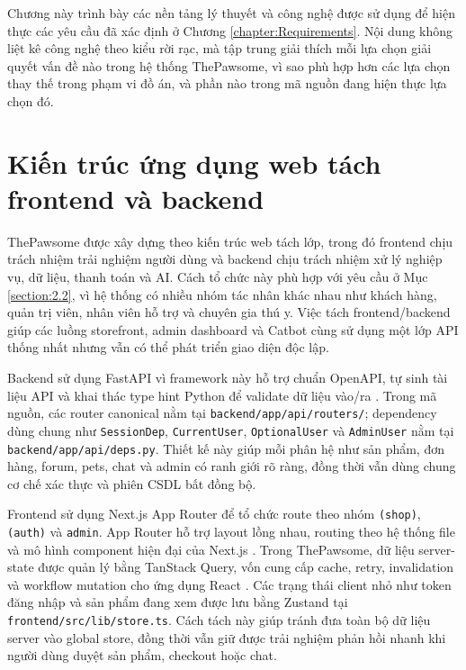 \documentclass[../DoAn.tex]{subfiles}
\begin{document}
Chương này trình bày các nền tảng lý thuyết và công nghệ được sử dụng để hiện thực các yêu cầu đã xác định ở Chương \ref{chapter:Requirements}. Nội dung không liệt kê công nghệ theo kiểu rời rạc, mà tập trung giải thích mỗi lựa chọn giải quyết vấn đề nào trong hệ thống ThePawsome, vì sao phù hợp hơn các lựa chọn thay thế trong phạm vi đồ án, và phần nào trong mã nguồn đang hiện thực lựa chọn đó.

\section{Kiến trúc ứng dụng web tách frontend và backend}
\label{section:3.1}

ThePawsome được xây dựng theo kiến trúc web tách lớp, trong đó frontend chịu trách nhiệm trải nghiệm người dùng và backend chịu trách nhiệm xử lý nghiệp vụ, dữ liệu, thanh toán và AI. Cách tổ chức này phù hợp với yêu cầu ở Mục \ref{section:2.2}, vì hệ thống có nhiều nhóm tác nhân khác nhau như khách hàng, quản trị viên, nhân viên hỗ trợ và chuyên gia thú y. Việc tách frontend/backend giúp các luồng storefront, admin dashboard và Catbot cùng sử dụng một lớp API thống nhất nhưng vẫn có thể phát triển giao diện độc lập.

Backend sử dụng FastAPI vì framework này hỗ trợ chuẩn OpenAPI, tự sinh tài liệu API và khai thác type hint Python để validate dữ liệu vào/ra \cite{fastapiDocs}. Trong mã nguồn, các router canonical nằm tại \texttt{backend/app/api/routers/}; dependency dùng chung như \texttt{SessionDep}, \texttt{CurrentUser}, \texttt{OptionalUser} và \texttt{AdminUser} nằm tại \texttt{backend/app/api/deps.py}. Thiết kế này giúp mỗi phân hệ như sản phẩm, đơn hàng, forum, pets, chat và admin có ranh giới rõ ràng, đồng thời vẫn dùng chung cơ chế xác thực và phiên CSDL bất đồng bộ.

Frontend sử dụng Next.js App Router để tổ chức route theo nhóm \texttt{(shop)}, \texttt{(auth)} và \texttt{admin}. App Router hỗ trợ layout lồng nhau, routing theo hệ thống file và mô hình component hiện đại của Next.js \cite{nextjsAppRouterDocs}. Trong ThePawsome, dữ liệu server-state được quản lý bằng TanStack Query, vốn cung cấp cache, retry, invalidation và workflow mutation cho ứng dụng React \cite{tanstackQueryDocs}. Các trạng thái client nhỏ như token đăng nhập và sản phẩm đang xem được lưu bằng Zustand tại \texttt{frontend/src/lib/store.ts}. Cách tách này giúp tránh đưa toàn bộ dữ liệu server vào global store, đồng thời vẫn giữ được trải nghiệm phản hồi nhanh khi người dùng duyệt sản phẩm, checkout hoặc chat.
\end{document}
